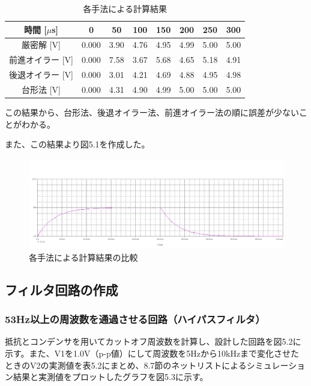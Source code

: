 \documentclass{jlreq}
\numberwithin{equation}{section}
\begin{document}
\begin{table}[H]
  \centering
  \caption{各手法による計算結果}
  \begin{tabular}{|c|c|c|c|c|c|c|c|}
    \hline
    時間 [\(\mu\)s] & 0 & 50 & 100 & 150 & 200 & 250 & 300 \\ \hline
    厳密解 [V] & 0.000 & 3.90 & 4.76 & 4.95 & 4.99 & 5.00 & 5.00 \\ \hline
    前進オイラー [V] & 0.000 & 7.58 & 3.67 & 5.68 & 4.65 & 5.18 & 4.91 \\ \hline
    後退オイラー [V] & 0.000 & 3.01 & 4.21 & 4.69 & 4.88 & 4.95 & 4.98 \\ \hline
    台形法 [V] & 0.000 & 4.31 & 4.90 & 4.99 & 5.00 & 5.00 & 5.00 \\ \hline
  \end{tabular}
\end{table}

この結果から、台形法、後退オイラー法、前進オイラー法の順に誤差が少ないことがわかる。

また、この結果より図5.1を作成した。

\begin{figure}[H]
  \centering
  \includegraphics[width=\textwidth]{assets/katohikakuplot.png}
  \caption{各手法による計算結果の比較}
\end{figure}

\subsection{フィルタ回路の作成}
\subsubsection{53Hz以上の周波数を通過させる回路（ハイパスフィルタ）}
抵抗とコンデンサを用いてカットオフ周波数を計算し、設計した回路を図5.2に示す。また、V1を1.0V（p-p値）にして周波数を5Hzから10kHzまで変化させたときのV2の実測値を表5.2にまとめ、8.7節のネットリストによるシミュレーション結果と実測値をプロットしたグラフを図5.3に示す。
\end{document}
